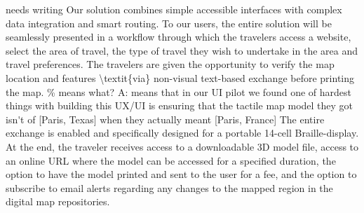 \ac{ needs writing


Our solution combines simple accessible interfaces with complex data integration and smart routing. To our users, the entire solution will be seamlessly presented in a workflow through which the travelers access a website, select the area of travel, the type of travel they wish to undertake in the area and travel preferences. The travelers are given the opportunity to verify the map location and features \textit{via} non-visual text-based exchange before printing the map.

The entire exchange is enabled and specifically designed for a portable 14-cell Braille-display. At the end, the traveler receives access to a downloadable 3D model file, access to an online URL where the model can be accessed for a specified duration, the option to have the model printed and sent to the user for a fee, and the option to subscribe to email alerts regarding any changes to the mapped region in the digital map repositories. 

}